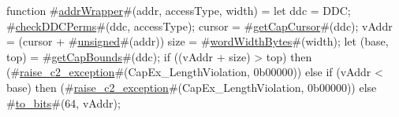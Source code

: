 function #\hyperref[zaddrWrapper]{addrWrapper}#(addr, accessType, width) =
  {
    let ddc = DDC;
    #\hyperref[zcheckDDCPerms]{checkDDCPerms}#(ddc, accessType);
    cursor = #\hyperref[zgetCapCursor]{getCapCursor}#(ddc);
    vAddr  = (cursor + #\hyperref[zunsigned]{unsigned}#(addr)) %
    size   = #\hyperref[zwordWidthBytes]{wordWidthBytes}#(width);
    let (base, top) = #\hyperref[zgetCapBounds]{getCapBounds}#(ddc);
    if ((vAddr + size) > top) then
      (#\hyperref[zraisezyc2zyexception]{raise\_c2\_exception}#(CapEx_LengthViolation, 0b00000))
    else if (vAddr < base) then
      (#\hyperref[zraisezyc2zyexception]{raise\_c2\_exception}#(CapEx_LengthViolation, 0b00000))
    else
      #\hyperref[ztozybits]{to\_bits}#(64, vAddr);
  }
